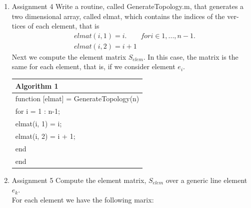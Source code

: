 \documentclass[a4paper,10pt]{report}
\begin{document}
\begin{enumerate}
\item{Assignment 4} Write a routine, called GenerateTopology.m, that generates
a two dimensional array, called elmat, which contains the indices of the ver-
tices of each element, that is
\begin{align*}
&elmat(i, 1) = i. \qquad for i ∈ {1, . . . , n − 1}.\\
&elmat(i, 2) = i + 1
\end{align*}
Next we compute the element matrix $S_{elem}$. In this case, the matrix is the
same for each element, that is, if we consider element $e_i$.

\begin{table}[!h]
\centering
\begin{tabular}{ |l| } 
\hline
\textbf{Algorithm 1}\\
\hline
\hspace{0.5cm}function [elmat] = GenerateTopology(n)\\
\hspace{0.5cm}for i = 1 : n-1;\\
\hspace{1cm}elmat(i, 1) = i;\\
\hspace{1cm}elmat(i, 2) = i + 1;\\
\hspace{0.5cm}end\\
\hspace{0.5cm}end\\
\hline
\end{tabular}
\end{table}


\item{Assignment 5} Compute the element matrix, $S_{elem}$ over a generic line element $e_k$.\\
For each element we have the following marix:


\end{enumerate}
\end{document}
